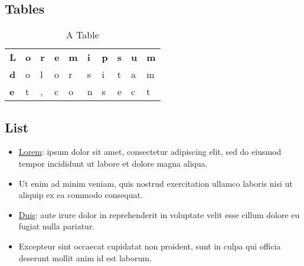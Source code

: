 \documentclass[12pt, a4paper]{article} %
\begin{document}

\subsection{Tables}


\begin{table}[H]
\centering
\caption{A Table}
\label{tab:tbl1}
\begin{tabular}{llllllllll}
\textbf{L}                      & \textbf{o}             & \textbf{r}             & \textbf{e}             & \textbf{m}             & \textbf{i}             & \textbf{p}             & \textbf{s}             & \textbf{u}             & \textbf{m}             \\ \cline{2-10} 
\multicolumn{1}{l|}{\textbf{d}} & \multicolumn{1}{l|}{o} & \multicolumn{1}{l|}{l} & \multicolumn{1}{l|}{o} & \multicolumn{1}{l|}{r} & \multicolumn{1}{l|}{s} & \multicolumn{1}{l|}{i} & \multicolumn{1}{l|}{t} & \multicolumn{1}{l|}{a} & \multicolumn{1}{l|}{m} \\ \cline{2-10} 
\multicolumn{1}{l|}{\textbf{e}} & \multicolumn{1}{l|}{t} & \multicolumn{1}{l|}{,} & \multicolumn{1}{l|}{c} & \multicolumn{1}{l|}{o} & \multicolumn{1}{l|}{n} & \multicolumn{1}{l|}{s} & \multicolumn{1}{l|}{e} & \multicolumn{1}{l|}{c} & \multicolumn{1}{l|}{t} \\ \cline{2-10} 
\end{tabular}
\end{table}


\subsection{List}

\begin{itemize}

\item \underline{Lorem}: ipsum dolor sit amet, consectetur adipiscing elit, sed do eiusmod tempor incididunt ut labore et dolore magna aliqua.
\item Ut enim ad minim veniam, quis nostrud exercitation ullamco laboris nisi ut aliquip ex ea commodo consequat.
\item \underline{Duis}: aute irure dolor in reprehenderit in voluptate velit esse cillum dolore eu fugiat nulla pariatur.
\item Excepteur sint occaecat cupidatat non proident, sunt in culpa qui officia deserunt mollit anim id est laborum.

\end{itemize}
\end{document}
